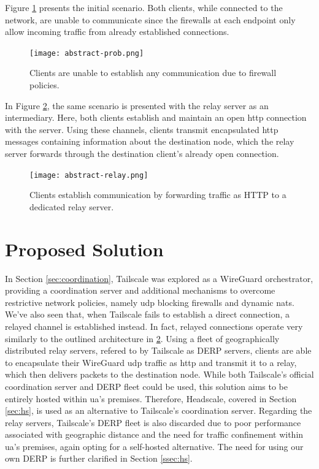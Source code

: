 \documentclass[11pt,twoside,a4paper]{report}
\begin{document}
Figure \ref{fig:absprob} presents the initial scenario. Both clients, while connected to the network, are unable to communicate since the firewalls at each endpoint only allow incoming traffic from already established connections.

\begin{figure}[h]
\centering
\texttt{[image: abstract-prob.png]}
\caption{Clients are unable to establish any communication due to firewall policies.}
\label{fig:absprob}
\end{figure}

In Figure \ref{fig:absrelay}, the same scenario is presented with the relay server as an intermediary. Here, both clients establish and maintain an open \ac{http} connection with the server. Using these channels, clients transmit encapsulated \ac{http} messages containing information about the destination node, which the relay server forwards through the destination client's already open connection.

\begin{figure}[h]
\centering
\texttt{[image: abstract-relay.png]}
\caption{Clients establish communication by forwarding traffic as HTTP to a dedicated relay server.}
\label{fig:absrelay}
\end{figure}

\section{Proposed Solution}

In Section \ref{sec:coordination}, Tailscale was explored as a WireGuard orchestrator, providing a coordination server and additional mechanisms to overcome restrictive network policies, namely \ac{udp} blocking firewalls and dynamic \ac{nat}s. We've also seen that, when Tailscale fails to establish a direct connection, a relayed channel is established instead. In fact, relayed connections operate very similarly to the outlined architecture in \ref{fig:absrelay}. Using a fleet of geographically distributed relay servers, refered to by Tailscale as \ac{DERP} servers, clients are able to encapsulate their WireGuard \ac{udp} traffic as \ac{http} and transmit it to a relay, which then delivers packets to the destination node. While both Tailscale's official coordination server and \ac{DERP} fleet could be used, this solution aims to be entirely hosted within \ac{ua}'s premises. Therefore, Headscale, covered in Section \ref{sec:hs}, is used as an alternative to Tailscale's coordination server. Regarding the relay servers, Tailscale's \ac{DERP} fleet is also discarded due to poor performance associated with geographic distance and the need for traffic confinement within \ac{ua}'s premises, again opting for a self-hosted alternative. The need for using our own \ac{DERP} is further clarified in Section \ref{ssec:hs}.
\end{document}
